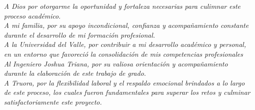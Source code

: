\vspace*{4cm}
{
\raggedleft
\textit{A Dios por otorgarme la oportunidad y fortaleza necesarias para culimnar este proceso académico.\\
A mi familia, por su apoyo incondicional, confianza y acompañamiento constante durante el desarrollo de mi formación profesional.\\
A la Universidad del Valle, por contribuir a mi desarrollo académico y personal, en un entorno que favoreció la consolidación de mis competencias profesionales\\
Al Ingeniero Joshua Triana, por su valiosa orientación y acompañamiento durante la elaboración de este trabajo de grado.\\
A Truora, por la flexibilidad laboral y el respaldo emocional brindados a lo largo de este proceso, los cuales fueron fundamentales para superar los retos y culminar satisfactoriamente este proyecto. \\
}
}